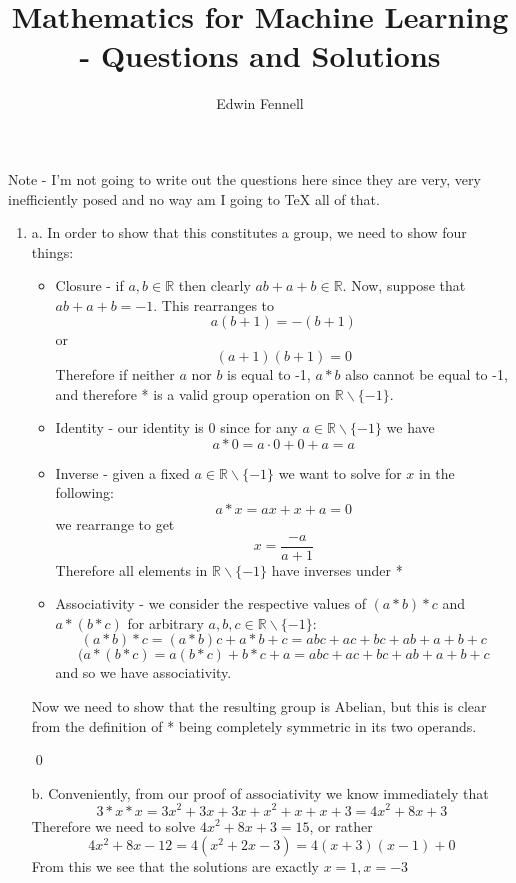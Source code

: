 \documentclass{article}
\title{Mathematics for Machine Learning - Questions and Solutions}
\author{Edwin Fennell}
\date{}
\newcommand{\chapternumber}{2}
\newenvironment{QandA}{\begin{enumerate}[label=\chapternumber.\arabic*]\bfseries\boldmath}
	{\end{enumerate}}
\newenvironment{answered}{\par\bigskip\normalfont\unboldmath}{}
\begin{document}
	\maketitle
	
	Note - I'm not going to write out the questions here since they are very, very inefficiently posed and no way am I going to TeX all of that.
	
	\noindent%
	\begin{QandA}
		\item
		\begin{answered}
			a. In order to show that this constitutes a group, we need to show four things:
			\begin{itemize}
				\item Closure - if $a,b\in\mathbb{R}$ then clearly $ab+a+b\in\mathbb{R}$.
				Now, suppose that $ab + a + b=-1$. This rearranges to
				\[a(b+1)=-(b+1)\]
				or 
				\[(a+1)(b+1)=0\]
				Therefore if neither $a$ nor $b$ is equal to -1, $a*b$ also cannot be equal to -1, and therefore * is a valid group operation on $\mathbb{R}\backslash\{-1\}$.
				\item Identity - our identity is 0 since for any $a\in\mathbb{R}\backslash\{-1\}$ we have
				\[a*0 = a\cdot0 + 0 + a = a\]
				\item Inverse - given a fixed $a\in\mathbb{R}\backslash\{-1\}$ we want to solve for $x$ in the following:
				\[a*x = ax + x + a = 0\]
				we rearrange to get
				\[x = \frac{-a}{a+1}\]
				Therefore all elements in $\mathbb{R}\backslash\{-1\}$ have inverses under *
				\item Associativity - we consider the respective values of $(a*b)*c$ and $a*(b*c)$ for arbitrary $a,b,c\in\mathbb{R}\backslash\{-1\}$:
				\[(a*b)*c = (a*b)c + a*b + c = abc + ac + bc + ab + a + b + c\]
				\[(a*(b*c) = a(b*c) + b*c + a = abc + ac + bc + ab + a + b + c\]
				and so we have associativity.
						
			\end{itemize}
				
				Now we need to show that the resulting group is Abelian, but this is clear from the definition of * being completely symmetric in its two operands.
				
				\qed
				
				b. Conveniently, from our proof of associativity we know immediately that
				\[3*x*x = 3x^2 + 3x + 3x + x^2 + x + x + 3 = 4x^2 + 8x + 3\]
				Therefore we need to solve $4x^2 + 8x + 3 = 15$, or rather
				\[4x^2 + 8x - 12 = 4(x^2 + 2x -3) = 4(x+3)(x-1)+0\]
				From this we see that the solutions are exactly $x=1,x=-3$
		\end{answered}
		

\end{QandA}
\end{document}
